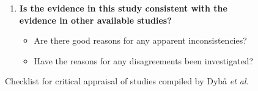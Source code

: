 \begin{figure}
{{\begin{enumerate}
\begin{itemize}
	\item Are the guidelines well described and easy to use?
	\item Will the benefits of using the guidelines outweigh the costs?
	\end{itemize}
\item \textbf{Is the evidence in this study consistent with the evidence in other available studies?}
	\begin{itemize}
	\item Are there good reasons for any apparent inconsistencies?
	\item Have the reasons for any disagreements been investigated?
	\end{itemize}
\end{enumerate}
}}
\caption{Checklist for critical appraisal of studies compiled by Dyb{\aa} \emph{et al.} \cite{Dyba2005}}
\label{fig:critical appraisal}
\end{figure}

